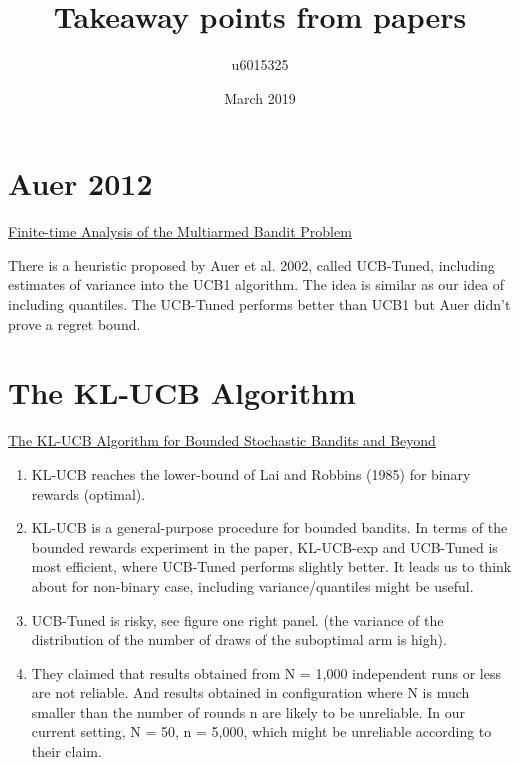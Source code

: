 \documentclass{article}
\title{Takeaway points from papers}
\author{u6015325 }
\date{March 2019}
\begin{document}
\maketitle

\section{Auer 2012}
\href{https://homes.di.unimi.it/~cesabian/Pubblicazioni/ml-02.pdf}{Finite-time Analysis of the Multiarmed Bandit Problem} \cite{auer2002finite}

There is a heuristic proposed by Auer et al. 2002, called UCB-Tuned, including estimates of variance into the UCB1 algorithm. The idea is similar as our idea of including quantiles.
The UCB-Tuned performs better than UCB1 but Auer didn't prove a regret bound.
\section{The KL-UCB Algorithm }
\href{https://arxiv.org/abs/1102.2490}{The KL-UCB Algorithm for Bounded Stochastic Bandits and Beyond} \cite{garivier2011kl}
\begin{enumerate}
    \item KL-UCB reaches the lower-bound of Lai and Robbins (1985) for binary rewards (optimal).
    \item KL-UCB is a general-purpose procedure for bounded bandits. In terms of the bounded rewards experiment in the paper, KL-UCB-exp and UCB-Tuned is most efficient, where UCB-Tuned performs slightly better. It leads us to think about for non-binary case, including variance/quantiles might be useful.
    \item UCB-Tuned is risky, see figure one right panel. (the variance of the distribution of the number of draws of the suboptimal arm is high).
    \item They claimed that results obtained from N = 1,000 independent runs or less are not reliable. And results obtained in configuration where N is much smaller than the number of rounds n are likely to be unreliable. In our current setting, N = 50, n = 5,000, which might be unreliable according to their claim.
\end{enumerate}
\end{document}
